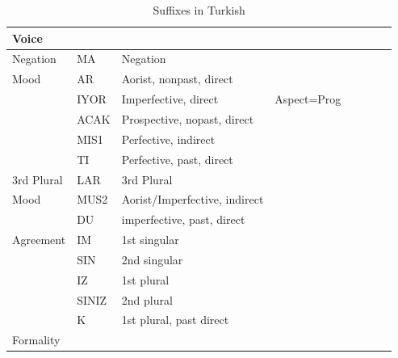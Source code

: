 \documentclass[11pt,letterpaper]{article}
\begin{document}
\begin{table}
\begin{tabular}{llllllll}
\hline
Voice \\
\hline
Negation  & MA & Negation & \\
\hline
Mood      & AR & Aorist, nonpast, direct \\
          & IYOR & Imperfective, direct & Aspect=Prog\\
          & ACAK & Prospective, nopast, direct\\
          & MIS1  & Perfective, indirect \\
          & TI & Perfective, past, direct \\
          \hline
3rd Plural& LAR & 3rd Plural\\ \hline
Mood      & MUS2 & Aorist/Imperfective, indirect \\
          & DU & imperfective, past, direct \\
\hline
Agreement & IM & 1st singular\\
          & SIN &2nd singular\\
          & IZ  & 1st plural\\
          & SINIZ & 2nd plural \\
          & K     & 1st plural, past direct \\
          \hline
Formality \\
\hline
\end{tabular}
\caption{Suffixes in Turkish}
\end{table}
\end{document}
